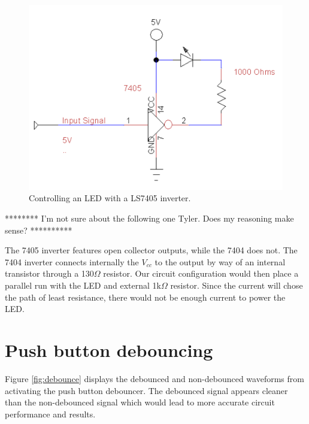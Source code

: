 \documentclass[11pt]{article}
\begin{document}
\begin{figure}[h]
	\centering
	\includegraphics[scale=0.6, draft=false]{inverter}
	\caption{Controlling an LED with a LS7405 inverter.}
	\label{fig:inverter}
\end{figure}

******** I'm not sure about the following one Tyler. Does my reasoning make sense? **********

The 7405 inverter features open collector outputs, while the 7404 does not. The 7404 inverter connects internally the $V_{cc}$ to the output by way of an internal transistor through a 130${\Omega}$ resistor. Our circuit configuration would then place a parallel run with the LED and external 1k${\Omega}$ resistor. Since the current will chose the path of least resistance, there would not be enough current to power the LED. 

\section{Push button debouncing}

Figure \ref{fig:debounce} displays the debounced and non-debounced waveforms from activating the push button debouncer. The debounced signal appears cleaner than the non-debounced signal which would lead to more accurate circuit performance and results.
\end{document}
